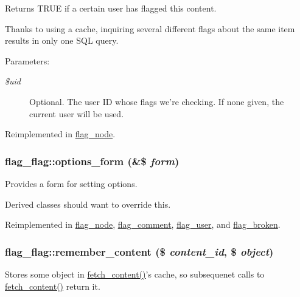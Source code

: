 Returns TRUE if a certain user has flagged this content.

Thanks to using a cache, inquiring several different flags about the same item results in only one SQL query.

\begin{Desc}
\item[Parameters:]
\begin{description}
\item[{\em \$uid}]Optional. The user ID whose flags we're checking. If none given, the current user will be used. \end{description}
\end{Desc}


Reimplemented in \hyperlink{classflag__node_4e9609c89fcd8ec905c6537d241fd49f}{flag\_\-node}.\hypertarget{classflag__flag_28aec91da5bc068c6c2a9a707ef62345}{
\subsubsection[{options\_\-form}]{\setlength{\rightskip}{0pt plus 5cm}flag\_\-flag::options\_\-form (\&\$ {\em form})}}
\label{classflag__flag_28aec91da5bc068c6c2a9a707ef62345}


Provides a form for setting options.

Derived classes should want to override this. 

Reimplemented in \hyperlink{classflag__node_5130212d8df4885b0fc5bcace0f6345d}{flag\_\-node}, \hyperlink{classflag__comment_6497f5efb8c81036572b81b91736dfea}{flag\_\-comment}, \hyperlink{classflag__user_2a425815ad46c2ffd8f48ded77d06231}{flag\_\-user}, and \hyperlink{classflag__broken_85e471e11b2a6b3781a52ff79864ae93}{flag\_\-broken}.\hypertarget{classflag__flag_f42191a47f6338e9176aa328bec5d56f}{
\subsubsection[{remember\_\-content}]{\setlength{\rightskip}{0pt plus 5cm}flag\_\-flag::remember\_\-content (\$ {\em content\_\-id}, \/  \$ {\em object})}}
\label{classflag__flag_f42191a47f6338e9176aa328bec5d56f}


Stores some object in \hyperlink{classflag__flag_c3ce89d9e532fb31b9552ff37b7f0f08}{fetch\_\-content()}'s cache, so subsequenet calls to \hyperlink{classflag__flag_c3ce89d9e532fb31b9552ff37b7f0f08}{fetch\_\-content()} return it.

